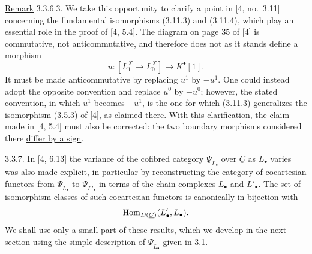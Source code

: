 \underline{Remark} 3.3.6.3. We take this opportunity to clarify a
point in [4, no.~3.11] concerning the fundamental isomorphisms
(3.11.3) and (3.11.4), which play an essential role in the proof of
[4, 5.4]. The diagram on page 35 of [4] is commutative, not
anticommutative, and therefore does not as it stands define a
morphism
\[
 u:[L^X_1\longrightarrow L^X_0]\longrightarrow K^\bullet[1].
\]
It must be made anticommutative by replacing $u^1$ by $-u^1$. One
could instead adopt the opposite convention and replace $u^0$ by
$-u^0$; however, the stated convention, in which $u^1$ becomes
$-u^1$, is the one for which (3.11.3) generalizes the isomorphism
(3.5.3) of [4], as claimed there. With this clarification, the claim
made in [4, 5.4] must also be corrected: the two boundary morphisms
considered there \underline{differ by a sign}.

3.3.7. In [4, 6.13] the variance of the cofibred category
$\underline\Psi_{L_\bullet}$ over $\underline C$ as $L_\bullet$
varies was also made explicit, in particular by reconstructing the
category of cocartesian functors from $\underline\Psi_{L_\bullet}$
to $\underline\Psi_{L'_\bullet}$ in terms of the chain complexes
$L_\bullet$ and $L'_\bullet$. The set of isomorphism classes of such
cocartesian functors is canonically in bijection with
\[
 \Hom_{D(\underline C)}(L'_\bullet,L_\bullet).
\]
We shall use only a small part of these results, which we develop in
the next section using the simple description of
$\underline\Psi_{L_\bullet}$ given in 3.1.
